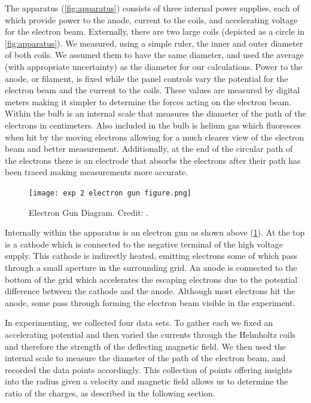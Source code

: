 \documentclass[prX,nofootinbib,notitlepage]{revtex4-1}
\begin{document}
The apparatus (\ref{fig:apparatus}) consists of three internal power supplies, each of which provide power to the anode, current to the coils, and accelerating voltage for the electron beam. Externally, there are two large coils (depicted as a circle in \ref{fig:apparatus}). We measured, using a simple ruler, the inner and outer diameter of both coils. We assumed them to have the same diameter, and used the average (with appropriate uncertainty) as the diameter for our calculations. Power to the anode, or filament, is fixed while the panel controls vary the potential for the electron beam and the current to the coils. These values are measured by digital meters making it simpler to determine the forces acting on the electron beam. Within the bulb is an internal scale that measures the diameter of the path of the electrons in centimeters. Also included in the bulb is helium gas which fluoresces when hit by the moving electrons allowing for a much clearer view of the electron beam and better measurement. Additionally, at the end of the circular path of the electrons there is an electrode that absorbs the electrons after their path has been traced making measurements more accurate. 

\begin{figure}[h!]
    \centering
    \texttt{[image: exp 2 electron gun figure.png]}
    \caption{Electron Gun Diagram. Credit: \cite{PHYS506}.}
    \label{fig:gun_schematic}
\end{figure}

Internally within the apparatus is an electron gun as shown above (\ref{fig:gun_schematic}). At the top is a cathode which is connected to the negative terminal of the high voltage supply. This cathode is indirectly heated, emitting electrons some of which pass through a small aperture in the surrounding grid. An anode is connected to the bottom of the grid which accelerates the escaping electrons due to the potential difference between the cathode and the anode. Although most electrons hit the anode, some pass through forming the electron beam visible in the experiment. 

In experimenting, we collected four data sets. To gather each we fixed an accelerating potential and then varied the currents through the Helmholtz coils and therefore the strength of the deflecting magnetic field. We then used the internal scale to measure the diameter of the path of the electron beam, and recorded the data points accordingly. This collection of points offering insights into the radius given a velocity and magnetic field allows us to determine the ratio of the charges, as described in the following section.
\end{document}
